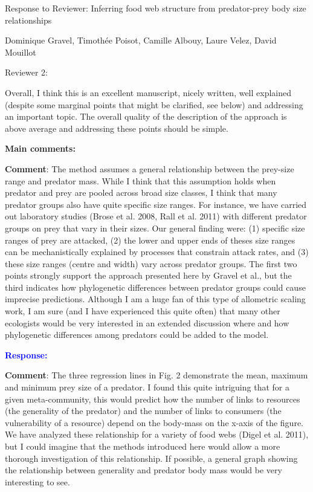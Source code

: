 \documentclass [12pt,onecolumn,twoside,openright]{report}
\begin{document}
 \begin{onehalfspacing} \begin{center} \large{Response to
Reviewer: Inferring food web structure from predator-prey body size
relationships} \end{center}

Dominique Gravel, Timoth\'ee Poisot, Camille Albouy, Laure Velez, David Mouillot
\begin{center} Reviewer 2: \end{center}

Overall, I think this is an excellent manuscript, nicely written, well explained
(despite some marginal points that might be clarified, see below) and addressing
an important topic. The overall quality of the description of the approach is
above average and addressing these points should be simple.

\medskip \textbf{\large{Main comments:}}

\medskip \textbf{Comment}: The method assumes a general
relationship between the prey-size range and predator mass. While I think that
this assumption holds when predator and prey are pooled across broad size
classes, I think that many predator groups also have quite specific size ranges.
For instance, we have carried out laboratory studies (Brose et al. 2008, Rall et
al. 2011) with different predator groups on prey that vary in their sizes. Our
general finding were: (1) specific size ranges of prey are attacked, (2) the
lower and upper ends of theses size ranges can be mechanistically explained by
processes that constrain attack rates, and (3) these size ranges (centre and
width) vary across predator groups. The first two points strongly support the
approach presented here by Gravel et al., but the third indicates how
phylogenetic differences between predator groups could cause imprecise
predictions. Although I am a huge fan of this type of allometric scaling work, I
am sure (and I have experienced this quite often) that many other ecologists
would be very interested in an extended discussion where and how phylogenetic
differences among predators could be added to the model.

\medskip \textcolor{blue}{\textbf{Response:}} \textit{\textcolor{blue}{}}

\medskip \textbf{Comment}: The three regression lines in Fig.
2 demonstrate the mean, maximum and minimum prey size of a predator. I found
this quite intriguing that for a given meta-community, this would predict how
the number of links to resources (the generality of the predator) and the number
of links to consumers (the vulnerability of a resource) depend on the body-mass
on the x-axis of the figure. We have analyzed these relationship for a variety
of food webs (Digel et al. 2011), but I could imagine that the methods
introduced here would allow a more thorough investigation of this relationship.
If possible, a general graph showing the relationship between generality and
predator body mass would be very interesting to see.


\end{onehalfspacing}
\end{document}
